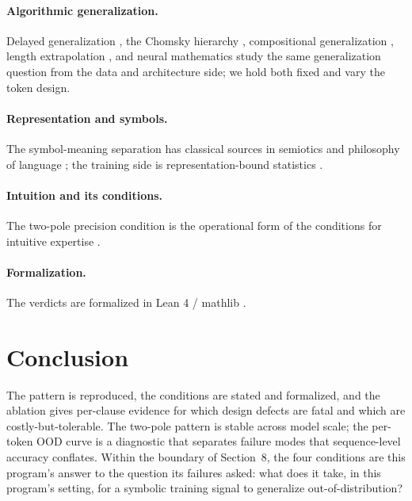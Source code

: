 \documentclass{article} %
\begin{document}
\paragraph{Algorithmic generalization.}
Delayed generalization \citep{power2022grokking}, the Chomsky
hierarchy \citep{deletang2022chomsky}, compositional
generalization \citep{lake2018generalization, keysers2020measuring,
hupkes2020compositionality, bahdanau2019systematic}, length
extrapolation \citep{anil2022exploring, jelassi2023length,
raffel2020exploring, press2021alibi, su2021roformer}, and neural
mathematics \citep{saxton2019analysing, lample2020deep,
hendrycks2021measuring, razeghi2022impact} study the same
generalization question from the data and architecture side; we
hold both fixed and vary the token design.

\paragraph{Representation and symbols.}
The symbol-meaning separation has classical sources in
semiotics and philosophy of language \citep{saussure1916course,
peirce1931collected, frege1892sense, quine1960word,
wittgenstein1953investigations, chomsky1957syntax}; the training
side is representation-bound statistics \citep{lecun2015deep}.

\paragraph{Intuition and its conditions.}
The two-pole precision condition is the operational form of the
conditions for intuitive expertise \citep{kahneman2011thinking,
kahneman2009conditions, gigerenzer2011heuristic, evans2013dual,
dehaene1997number}.

\paragraph{Formalization.}
The verdicts are formalized in Lean 4 / mathlib
\citep{lean4, mathlib2020, mathlib2026, demoura2015lean,
avigad2018mechanization, buzzard2022rise, hales2017kepler}.

\section{Conclusion}

The pattern is reproduced, the conditions are stated and
formalized, and the ablation gives per-clause evidence for which
design defects are fatal and which are costly-but-tolerable. The
two-pole pattern is stable across model scale; the per-token OOD
curve is a diagnostic that separates failure modes that
sequence-level accuracy conflates. Within the boundary of
Section~8, the four conditions are this program's answer to the
question its failures asked: what does it take, in this program's
setting, for a symbolic training signal to generalize
out-of-distribution?
\end{document}
